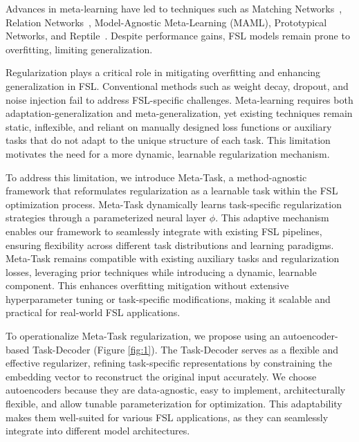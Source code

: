 Advances in meta-learning have led to techniques such as Matching Networks~\cite{matching}, Relation Networks~\cite{relation}, Model-Agnostic Meta-Learning (MAML)\cite{maml}, Prototypical Networks\cite{proto}, and Reptile~\cite{reptile}. Despite performance gains, FSL models remain prone to overfitting, limiting generalization.

Regularization plays a critical role in mitigating overfitting and enhancing generalization in FSL. Conventional methods such as weight decay\cite{krogh1991simple}, dropout\cite{hinton2012improving}, and noise injection\cite{achille2018information, alemi2016deep, tishby2015deep} fail to address FSL-specific challenges. Meta-learning requires both adaptation-generalization and meta-generalization\cite{imaml, mrmaml, pan2021meta, wang2023improving, yao2021meta, yao2021improving, rajendran2020meta}, yet existing techniques remain static, inflexible, and reliant on manually designed loss functions or auxiliary tasks that do not adapt to the unique structure of each task. This limitation motivates the need for a more dynamic, learnable regularization mechanism.

To address this limitation, we introduce Meta-Task, a method-agnostic framework that reformulates regularization as a learnable task within the FSL optimization process. Meta-Task dynamically learns task-specific regularization strategies through a parameterized neural layer $\phi$. This adaptive mechanism enables our framework to seamlessly integrate with existing FSL pipelines, ensuring flexibility across different task distributions and learning paradigms. Meta-Task remains compatible with existing auxiliary tasks and regularization losses, leveraging prior techniques while introducing a dynamic, learnable component. This enhances overfitting mitigation without extensive hyperparameter tuning or task-specific modifications, making it scalable and practical for real-world FSL applications.

To operationalize Meta-Task regularization, we propose using an autoencoder-based Task-Decoder (Figure \ref{fig:1}). The Task-Decoder serves as a flexible and effective regularizer, refining task-specific representations by constraining the embedding vector to reconstruct the original input accurately. We choose autoencoders because they are data-agnostic, easy to implement, architecturally flexible, and allow tunable parameterization for optimization. This adaptability makes them well-suited for various FSL applications, as they can seamlessly integrate into different model architectures.

